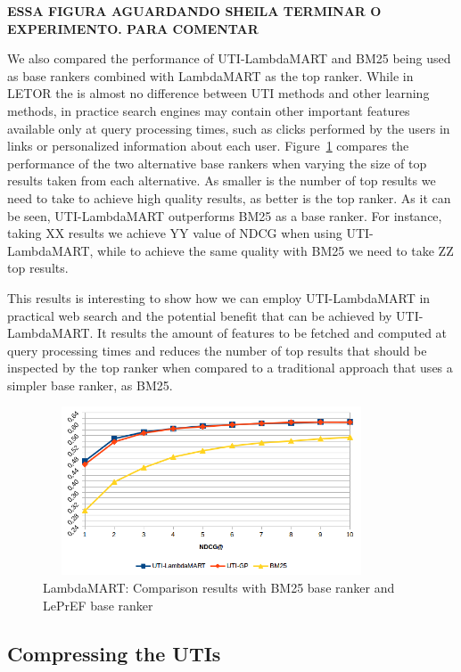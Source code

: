 \documentclass[preprint,review,10pt,3p]{elsarticle}
\begin{document}
{\bf
ESSA FIGURA AGUARDANDO SHEILA TERMINAR O EXPERIMENTO. PARA COMENTAR


We also compared the performance of  UTI-LambdaMART and BM25  being used as base rankers combined with LambdaMART as the top ranker. While in LETOR the is almost no difference between UTI methods and other learning methods, in practice search engines may contain other important features available only at query processing times, such as clicks performed by the users in links or personalized information about each user.  Figure~\ref{fig:bm25} compares the performance of the two alternative base rankers when varying the size of top results taken from each alternative. As smaller is the number of top results we need to take to achieve high quality results, as better is the top ranker. As it can be seen, UTI-LambdaMART outperforms  BM25 as a base ranker. For instance, taking XX results we achieve YY value of NDCG when using UTI-LambdaMART, while to achieve the same quality with BM25 we need to take ZZ top results.


This results is interesting to show how we can employ  UTI-LambdaMART in practical web search and the potential benefit that can be achieved by UTI-LambdaMART. It results the amount of features to be fetched and computed at query  processing times and reduces the number of top results that should be inspected by the top ranker when compared to a traditional approach that uses a simpler base ranker, as BM25.

\begin{figure}[h!]
\begin{center}
\includegraphics[width=10cm, height=5cm]{im_ndcg10leprefbm25.png}
\caption{LambdaMART: Comparison results with BM25 base ranker and LePrEF base ranker}
\label{fig:bm25}
\end{center}
\end{figure}

}

\subsection{Compressing the UTIs}
\label{sec:compression} 
\end{document}
